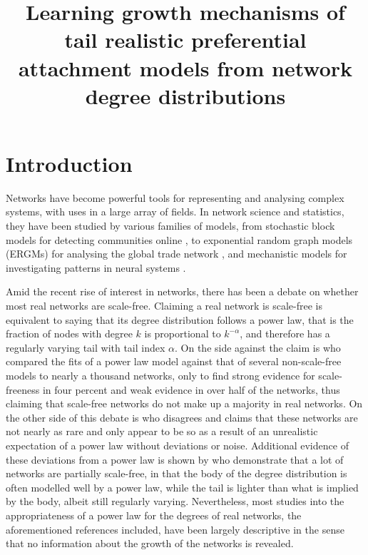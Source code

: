 \documentclass[
  sn-basic,
]{sn-jnl}
\title[Learning growth mechanisms of tail realistic preferential
attachment models from network degree distributions]{Learning growth
mechanisms of tail realistic preferential attachment models from network
degree distributions}
\author*[1]{\fnm{Thomas William} \sur{Boughen}}\email{t.w.boughen1@newcastle.ac.uk}\author[1]{\fnm{Clement} \sur{Lee}}\author[1]{\fnm{Vianey Palacios} \sur{Ramirez}}
\affil[1]{\orgdiv{School of Mathematics, Statistics and
Physics}, \orgname{Newcastle University}}
\theoremstyle{plain}
\theoremstyle{plain}
\theoremstyle{remark}
\begin{document}
\maketitle


\newpage

\section{Introduction}\label{introduction}

Networks have become powerful tools for representing and analysing
complex systems, with uses in a large array of fields. In network
science and statistics, they have been studied by various families of
models, from stochastic block models for detecting communities online
\citep{Latouche11}, to exponential random graph models (ERGMs) for
analysing the global trade network \citep{Setayesh22}, and mechanistic
models for investigating patterns in neural systems \citep{Betzel17}.

Amid the recent rise of interest in networks, there has been a debate on
whether most real networks are scale-free. Claiming a real network is
scale-free is equivalent to saying that its degree distribution follows
a power law, that is the fraction of nodes with degree \(k\) is
proportional to \(k^{-\alpha}\), and therefore has a regularly varying
tail with tail index \(\alpha\). On the side against the claim is
\citet{Broido_2019} who compared the fits of a power law model against
that of several non-scale-free models to nearly a thousand networks,
only to find strong evidence for scale-freeness in four percent and weak
evidence in over half of the networks, thus claiming that scale-free
networks do not make up a majority in real networks. On the other side
of this debate is \citet{Voitalov_2019} who disagrees and claims that
these networks are not nearly as rare and only appear to be so as a
result of an unrealistic expectation of a power law without deviations
or noise. Additional evidence of these deviations from a power law is
shown by \citet{Lee24} who demonstrate that a lot of networks are
partially scale-free, in that the body of the degree distribution is
often modelled well by a power law, while the tail is lighter than what
is implied by the body, albeit still regularly varying. Nevertheless,
most studies into the appropriateness of a power law for the degrees of
real networks, the aforementioned references included, have been largely
descriptive in the sense that no information about the growth of the
networks is revealed.
\end{document}
